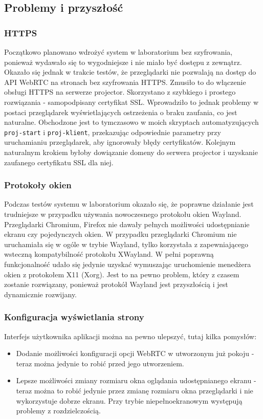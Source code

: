 \documentclass[a4paper,11pt]{article}
\begin{document}
        \subsection{Problemy i przyszłość}
            \subsubsection{HTTPS}
            Początkowo planowano wdrożyć system w laboratorium bez szyfrowania, ponieważ wydawało się to wygodniejsze i nie miało być dostępu z zewnątrz.
            Okazało się jednak w trakcie testów, że przeglądarki nie pozwalają na dostęp do API WebRTC na stronach bez szyfrowania HTTPS.
            Zmusiło to do włączenie obsługi HTTPS na serwerze projector. Skorzystano z szybkiego i prostego rozwiązania - samopodpisany certyfikat SSL.
            Wprowadziło to jednak problemy w postaci przeglądarek wyświetlających ostrzeżenia o braku zaufania, co jest naturalne. 
            Obchodzone jest to tymczasowo w moich skryptach automatyzujących \texttt{proj-start} i \texttt{proj-klient}, przekazując odpowiednie parametry przy uruchamianiu przeglądarek, aby ignorowały błędy certyfikatów.
            Kolejnym naturalnym krokiem byłoby dowiązanie domeny do serwera projector i uzyskanie zaufanego certyfikatu SSL dla niej. 
            \subsubsection{Protokoły okien}
            Podczas testów systemu w laboratorium okazało się, że poprawne działanie jest trudniejsze w przypadku używania nowoczesnego protokołu okien Wayland.
            Przeglądarki Chromium, Firefox nie dawały pełnych możliwości udostępnianie ekranu czy pojedynczych okien. 
            W przypadku przeglądarki Chromium nie uruchamiała się w ogóle w trybie Wayland, tylko korzystała z zapewniającego wsteczną kompatybilność protokołu XWayland.
            W pełni poprawną funkcjonalność udało się jedynie uzyskać wymuszając uruchomienie menedżera okien z protokołem X11 (Xorg).
            Jest to na pewno problem, który z czasem zostanie rozwiązany, ponieważ protokół Wayland jest przyszłością i jest dynamicznie rozwijany.
            \subsubsection{Konfiguracja wyświetlania strony}
            Interfejs użytkownika aplikacji można na pewno ulepszyć, tutaj kilka pomysłów: 
            \begin{itemize}
            \item Dodanie możliwości konfiguracji opcji WebRTC w utworzonym już pokoju - teraz można jedynie to robić przed jego utworzeniem.
            \item Lepsze możliwości zmiany rozmiaru okna oglądania udostępnianego ekranu - teraz można to robić jedynie przez zmianę rozmiaru okna przeglądarki i nie wykorzystuje dobrze ekranu.
            Przy trybie niepełnoekranowym występują problemy z rozdzielczością.
            \end{itemize}
\end{document}
